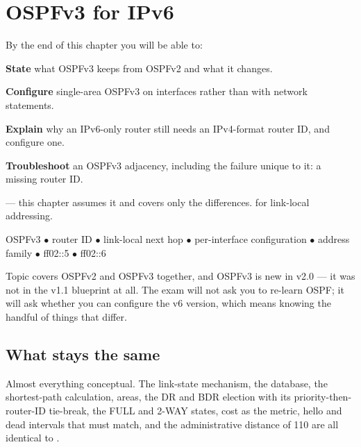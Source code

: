 \chapter{OSPFv3 for IPv6}\label{ch:ospfv3}

\begin{outcomes}
By the end of this chapter you will be able to:
\begin{tight}
  \item \textbf{State} what OSPFv3 keeps from OSPFv2 and what it changes.
  \item \textbf{Configure} single-area OSPFv3 on interfaces rather than with
        network statements.
  \item \textbf{Explain} why an IPv6-only router still needs an IPv4-format
        router ID, and configure one.
  \item \textbf{Troubleshoot} an OSPFv3 adjacency, including the failure unique to
        it: a missing router ID.
\end{tight}
\end{outcomes}

\begin{prereq}
 --- this chapter assumes it and covers only the differences.
 for link-local addressing.
\end{prereq}

\begin{keyterms}
OSPFv3 $\bullet$ router ID $\bullet$ link-local next hop $\bullet$ per-interface
configuration $\bullet$ address family $\bullet$ ff02::5 $\bullet$ ff02::6
\end{keyterms}

\begin{examnote}
Topic  covers OSPFv2 and OSPFv3 together, and OSPFv3 is new in v2.0 --- it
was not in the v1.1 blueprint at all. The exam will not ask you to re-learn OSPF;
it will ask whether you can configure the v6 version, which means knowing the
handful of things that differ.
\end{examnote}

\section{What stays the same}

Almost everything conceptual. The link-state mechanism, the database, the
shortest-path calculation, areas, the DR and BDR election with its priority-then-
router-ID tie-break, the FULL and 2-WAY states, cost as the metric, hello and
dead intervals that must match, and the administrative distance of 110 are all
identical to .

